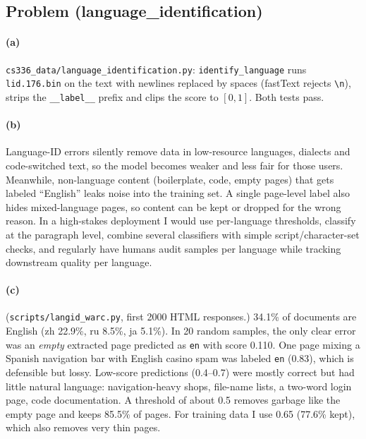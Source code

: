 \documentclass[11pt]{article}
\begin{document}
\subsection*{Problem (language\_identification)}

\paragraph{(a)} \texttt{cs336\_data/language\_identification.py}: \texttt{identify\_language} runs
\texttt{lid.176.bin} on the text with newlines replaced by spaces (fastText rejects
\texttt{\textbackslash n}), strips the \texttt{\_\_label\_\_} prefix and clips the score to $[0,1]$.
Both tests pass.

\paragraph{(b)}
Language-ID errors silently remove data in low-resource languages, dialects and
code-switched text, so the model becomes weaker and less fair for those users. Meanwhile,
non-language content (boilerplate, code, empty pages) that gets labeled ``English'' leaks
noise into the training set. A single page-level label also hides mixed-language pages, so
content can be kept or dropped for the wrong reason. In a high-stakes deployment I would use
per-language thresholds, classify at the paragraph level, combine several classifiers with
simple script/character-set checks, and regularly have humans audit samples per language
while tracking downstream quality per language.

\paragraph{(c)} (\texttt{scripts/langid\_warc.py}, first 2000 HTML responses.)
34.1\% of documents are English (zh 22.9\%, ru 8.5\%, ja 5.1\%). In 20 random samples, the only
clear error was an \emph{empty} extracted page predicted as \texttt{en} with score 0.110. One
page mixing a Spanish navigation bar with English casino spam was labeled \texttt{en} (0.83),
which is defensible but lossy. Low-score predictions (0.4--0.7) were mostly correct but
had little natural language: navigation-heavy shops, file-name lists, a two-word login page,
code documentation. A threshold of about 0.5 removes garbage like the empty page and keeps
85.5\% of pages. For training data I use 0.65 (77.6\% kept), which also removes very thin
pages.

\end{document}
